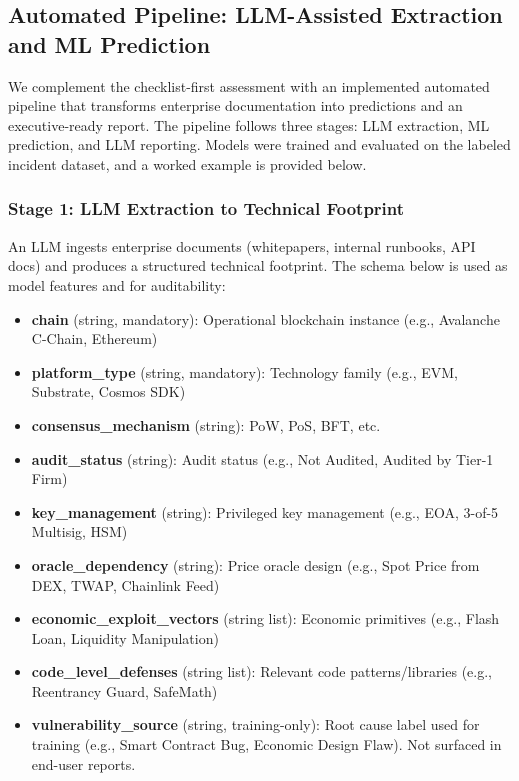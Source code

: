 \subsection{Automated Pipeline: LLM-Assisted Extraction and ML Prediction}
\label{sec:ml_pipeline}

We complement the checklist-first assessment with an implemented automated pipeline that transforms enterprise documentation into predictions and an executive-ready report. The pipeline follows three stages: LLM extraction, ML prediction, and LLM reporting. Models were trained and evaluated on the labeled incident dataset, and a worked example is provided below.

\subsubsection{Stage 1: LLM Extraction to Technical Footprint}
An LLM ingests enterprise documents (whitepapers, internal runbooks, API docs) and produces a structured technical footprint. The schema below is used as model features and for auditability:
\begin{itemize}
    \item \textbf{chain} (string, mandatory): Operational blockchain instance (e.g., Avalanche C-Chain, Ethereum)
    \item \textbf{platform\_type} (string, mandatory): Technology family (e.g., EVM, Substrate, Cosmos SDK)
    \item \textbf{consensus\_mechanism} (string): PoW, PoS, BFT, etc.
    \item \textbf{audit\_status} (string): Audit status (e.g., Not Audited, Audited by Tier-1 Firm)
    \item \textbf{key\_management} (string): Privileged key management (e.g., EOA, 3-of-5 Multisig, HSM)
    \item \textbf{oracle\_dependency} (string): Price oracle design (e.g., Spot Price from DEX, TWAP, Chainlink Feed)
    \item \textbf{economic\_exploit\_vectors} (string list): Economic primitives (e.g., Flash Loan, Liquidity Manipulation)
    \item \textbf{code\_level\_defenses} (string list): Relevant code patterns/libraries (e.g., Reentrancy Guard, SafeMath)
    \item \textbf{vulnerability\_source} (string, training-only): Root cause label used for training (e.g., Smart Contract Bug, Economic Design Flaw). Not surfaced in end-user reports.
\end{itemize}

